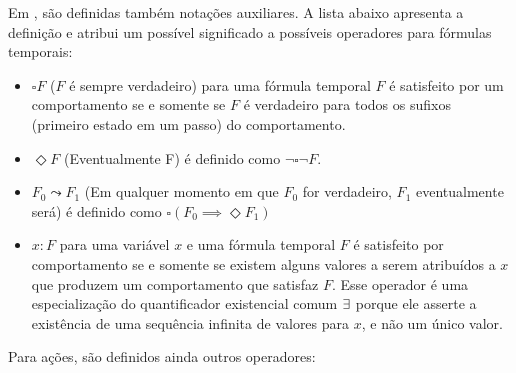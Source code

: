 Em \cite{tlaformalization}, são definidas também notações auxiliares. A lista abaixo apresenta a definição e atribui um possível significado a possíveis operadores para fórmulas temporais:
\begin{itemize}
  \item $\square F$ ($F$ é sempre verdadeiro) para uma fórmula temporal $F$ é satisfeito por um comportamento se e somente se $F$ é verdadeiro para todos os sufixos (primeiro estado em um passo) do comportamento.

  \item $\Diamond F$ (Eventualmente F) é definido como $\neg \square \neg F$.

  \item $F_0 \leadsto F_1$ (Em qualquer momento em que $F_0$ for verdadeiro, $F_1$ eventualmente será) é definido como $\square(F_0 \implies \Diamond F_1)$


  \item \EE $x : F$ para uma variável $x$ e uma fórmula temporal $F$ é satisfeito por comportamento se e somente se existem alguns valores a serem atribuídos a $x$ que produzem um comportamento que satisfaz $F$. Esse operador é uma especialização do quantificador existencial comum $\exists$ porque ele asserte a existência de uma sequência infinita de valores para $x$, e não um único valor.

\end{itemize}

Para ações, são definidos ainda outros operadores:

